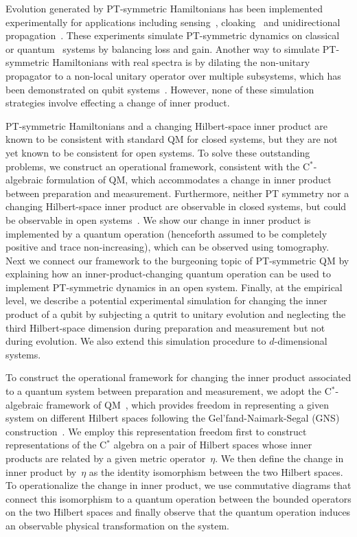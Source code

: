 \documentclass[amsmath,amssymb,aps,pra,superscriptaddress,twocolumn]{revtex4-2}
\begin{document}
Evolution generated by PT-symmetric Hamiltonians has been implemented experimentally
for applications including sensing~\cite{LZO+16,COZ+17,HHW+17}, cloaking~\cite{ZFZ+13,SFA15}
and unidirectional propagation~\cite{RKEC10}.
These experiments simulate PT-symmetric dynamics on classical~\cite{RME+10,SLZ+11,POS+14,ZZS+16} or
quantum~\cite{BDG+12,XZB+17,LHL+19,XQW+19} systems by balancing loss and gain.
Another way to simulate  PT-symmetric Hamiltonians with real spectra is by 
dilating the non-unitary propagator to a non-local unitary operator over multiple subsystems, which has been demonstrated 
on qubit systems~\cite{GS08a,GS08b,ZHL13,TWY+16,KAU17,HKW18,WLG+19,XWZ+19,GZL+21}.
However, none of these simulation strategies involve effecting a change 
of inner product.


PT-symmetric Hamiltonians and a changing Hilbert-space inner product
are known to be consistent with standard QM for closed systems,
but they are not yet known to be consistent for open systems.
To solve these outstanding problems, we 
construct an operational framework, consistent with the C$^*$-algebraic formulation of QM,
which accommodates a change in inner product between preparation and measurement.
Furthermore, neither PT symmetry nor a changing Hilbert-space inner product are observable in
closed systems, but could be observable in open systems~\cite{Bro16}.
We show our change in inner product is implemented by a quantum operation
(henceforth assumed to be completely positive and trace non-increasing),
which can be observed using tomography.
Next we connect our framework to the burgeoning topic of PT-symmetric QM
by explaining how an inner-product-changing quantum operation can be 
used to implement PT-symmetric dynamics in an open system.
Finally, at the empirical level, we describe a potential experimental simulation for changing the inner product 
of a qubit by subjecting a qutrit to unitary evolution and 
neglecting the third Hilbert-space dimension during preparation and measurement but not during evolution.
We also extend this simulation procedure to $d$-dimensional systems. 



To construct the operational framework for changing the inner product associated to a quantum system
between preparation and measurement,
we adopt the C$^*$-algebraic framework of QM~\cite{Str08},
which provides freedom in representing 
a given system on different Hilbert spaces following the Gel'fand-Naimark-Segal (GNS) construction~\cite{GN43,Seg47}.  
We employ this representation freedom 
first to construct representations of the C$^*$ algebra on a pair of Hilbert spaces 
whose inner products are related by a given metric operator~$\eta$. We then
define the change in inner product by~$\eta$ as the identity
isomorphism between the two Hilbert spaces.
To operationalize the change in inner product, we use commutative diagrams that connect 
this isomorphism to a quantum operation 
between the bounded operators on the two Hilbert spaces and 
finally observe that the quantum operation induces an observable physical transformation on the system.
\end{document}
